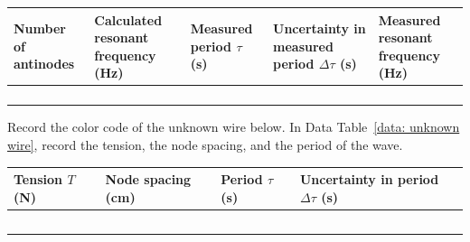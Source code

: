 \documentclass[addpoints]{physlabs}
\begin{document}
\begin{postlab}
    \begin{center}
        \captionsetup{font=normalsize}
        \renewcommand{\arraystretch}{2}
        \begin{tabular}{|>{\centering\arraybackslash}p{2.5cm}|>{\centering\arraybackslash}p{2.5cm}|>{\centering\arraybackslash}p{2.5cm}|>{\centering\arraybackslash}p{2.5cm}|>{\centering\arraybackslash}p{2.5cm}|}
        \hline
        \rowcolor{gray!20}
        Number of antinodes & Calculated resonant frequency (Hz) & Measured period $\tau$ (s) & Uncertainty in measured period $\Delta\tau$ (s) & Measured resonant frequency (Hz)
        \\
        \hline
        & & & & \\ \hline
        & & & & \\ \hline
        & & & & \\ \hline
        & & & & \\ \hline
        \end{tabular}
    \end{center}
    



    \filbreak
    \question[1] Record the color code of the unknown wire below. In Data Table~\ref{data: unknown wire}, record the tension, the node spacing, and the period of the wave.

    \begin{center}
        \captionsetup{font=normalsize}
        \renewcommand{\arraystretch}{2}
        \begin{tabular}{|>{\centering\arraybackslash}p{2.5cm}|>{\centering\arraybackslash}p{2.5cm}|>{\centering\arraybackslash}p{2.5cm}|>{\centering\arraybackslash}p{2.5cm}|}
        \hline
        \rowcolor{gray!20}
        Tension $T$ (N) & Node spacing (cm) & Period $\tau$ (s) & Uncertainty in period $\Delta\tau$ (s)
        \\
        \hline
        & & & \\ \hline
        & & & \\ \hline
        & & & \\ \hline
        & & & \\ \hline
        & & & \\ \hline
        \end{tabular}
    \end{center}


\end{postlab}
\end{document}
